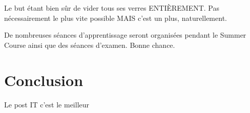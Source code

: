 \documentclass[12pt]{article}
\begin{document}
		Le but étant bien sûr de vider tous ses verres ENTIÈREMENT. Pas nécessairement le plus vite possible MAIS c’est un plus, naturellement.   


		De nombreuses séances d'apprentissage seront organisées pendant le Summer Course ainsi que des séances d’examen. Bonne chance. 

\section{Conclusion}
	Le post IT c'est le meilleur
		
		
\end{document}
